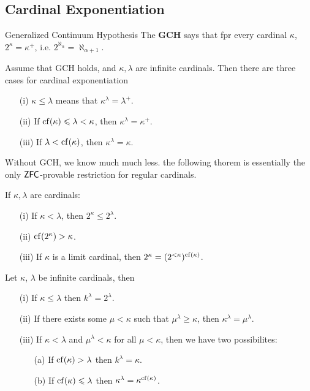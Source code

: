 \documentclass{article}
\begin{document}
\subsection{Cardinal Exponentiation}
\begin{fancydefine}{Generalized Continuum Hypothesis}
    The \textbf{GCH} says that fpr every cardinal $\kappa$, $2^{\kappa} = \kappa^{+}$, i.e. $2^{\aleph_{\alpha}}=\aleph_{\alpha+1}$.
\end{fancydefine}
\begin{fancythm}{}
    Assume that GCH holds, and $\kappa, \lambda$ are infinite cardinals. Then there are three cases for cardinal exponentiation \begin{enumerate}
        \item[(i)] $\kappa \leq \lambda$ means that $\kappa^{\lambda} = \lambda^{+}$.
        \item[(ii)] If $\operatorname{cf}(\kappa) \leqslant \lambda < \kappa$, then $\kappa^{\lambda}=\kappa^{+}$.
        \item[(iii)] If $\lambda < \operatorname{cf}(\kappa)$, then $\kappa^{\lambda}=\kappa$.
    \end{enumerate}
\end{fancythm}
Without GCH, we know much much less. the following thorem is essentially the only $\mathsf{ZFC}$-provable restriction for regular cardinals.
\begin{fancythm}{}
    If $\kappa, \lambda$ are cardinals: \begin{itemize}
        \item[(i)] If $\kappa < \lambda$, then $2^{\kappa} \leq 2^{\lambda}$.
        \item[(ii)] $\operatorname{cf}(2^{\kappa})>\kappa$.
        \item[(iii)] If $\kappa$ is a limit cardinal, then $2^{\kappa} = (2^{<\kappa})^{\operatorname{cf}(\kappa)}$.
    \end{itemize}
\end{fancythm}
\begin{fancythm}{}
    Let $\kappa$, $\lambda$ be infinite cardinals, then \begin{enumerate}
        \item[(i)] If $\kappa \leq \lambda$ then $k^{\lambda}=2^{\lambda}$.
        \item[(ii)] If there exists some $\mu < \kappa$ such that $\mu^{\lambda}\geq \kappa$, then $\kappa^{\lambda} = \mu^{\lambda}$.
        \item[(iii)] If $\kappa < \lambda$ and $\mu^{\lambda}<\kappa$ for all $\mu<\kappa$, then we have two possibilites:
              \begin{enumerate}
                  \item[(a)] If $\operatorname{cf}(\kappa)>\lambda$ then $k^{\lambda} = \kappa$.
                  \item[(b)] If $\operatorname{cf}(\kappa) \leqslant \lambda$ then $\kappa^{\lambda} = \kappa^{\operatorname{cf}(\kappa)}$.
              \end{enumerate}
    \end{enumerate}
\end{fancythm}
\end{document}
